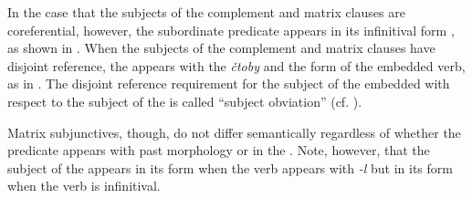 \documentclass[output=paper,modfonts,newtxmath,hidelinks,]{langscibook}
\begin{document}
\noindent In the case that the subjects of the complement and matrix clauses are coreferential, however, the subordinate predicate appears in its infinitival form \citep[160, 236]{Cubberley2002}, as shown in . When the subjects of the complement and matrix clauses have disjoint reference, the  appears with the  \textit{čtoby} and the  form of the embedded verb, as in . The disjoint reference requirement for the subject of the embedded   with respect to the subject of the  is called “subject obviation” (cf. \citealt[1]{Antonenko2010}).

\ea \label{10:ex16}
	\z
\z

\ea \label{10:ex17}
	\z
\z

\noindent Matrix subjunctives, though, do not differ semantically regardless of whether the predicate appears with past morphology or in the  \citep[10]{Asarina2006}. Note, however, that the subject of the  appears in its  form when the verb appears with \textit{{}-l} but in its  form when the verb is infinitival.
\end{document}
